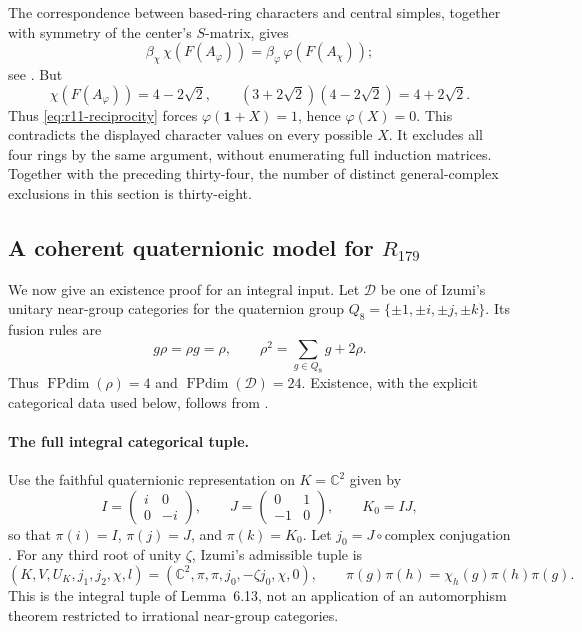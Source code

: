 The correspondence between based-ring characters and central simples,
together with symmetry of the center's $S$-matrix, gives
\begin{equation}\label{eq:r11-reciprocity}
 \beta_\chi\,\chi(F(A_\varphi))
 =\beta_\varphi\,\varphi(F(A_\chi));
\end{equation}
see \cite[Example~2.9 and the discussion preceding Theorem~2.13]
{OstrikPivotal}. But
\[
 \chi(F(A_\varphi))=4-2\sqrt2,
 \qquad
 (3+2\sqrt2)(4-2\sqrt2)=4+2\sqrt2.
\]
Thus \eqref{eq:r11-reciprocity} forces
$\varphi(\mathbf1+X)=1$, hence $\varphi(X)=0$. This contradicts the
displayed character values on every possible $X$. It excludes all four
rings by the same argument, without enumerating full induction matrices.
Together with the preceding thirty-four, the number of distinct
general-complex exclusions in this section is thirty-eight.

\subsection{A coherent quaternionic model for $R_{179}$}
\label{subsec:r11-quaternionic-model}

We now give an existence proof for an integral input. Let $\mathcal D$ be
one of Izumi's unitary near-group categories for the quaternion group
$Q_8=\{\pm1,\pm i,\pm j,\pm k\}$. Its fusion rules are
\begin{equation}\label{eq:r11-Q8-base}
 g\rho=\rho g=\rho,
 \qquad \rho^2=\sum_{g\in Q_8}g+2\rho.
\end{equation}
Thus $\operatorname{FPdim}(\rho)=4$ and
$\operatorname{FPdim}(\mathcal D)=24$.
Existence, with the explicit categorical data used below, follows from
\cite[Theorems~1.1 and~6.1, Lemma~6.13]{Izumi}.

\paragraph{The full integral categorical tuple.}
Use the faithful quaternionic representation on $K=\mathbb C^2$ given by
\[
 I=\begin{pmatrix}i&0\\0&-i\end{pmatrix},
 \qquad J=\begin{pmatrix}0&1\\-1&0\end{pmatrix},
 \qquad K_0=IJ,
\]
so that $\pi(i)=I$, $\pi(j)=J$, and $\pi(k)=K_0$.
Let $j_0=J\circ\text{complex conjugation}$. For any third root of unity
$\zeta$, Izumi's admissible tuple is
\begin{equation}\label{eq:r11-integral-tuple}
 (K,V,U_K,j_1,j_2,\chi,l)
 =(\mathbb C^2,\pi,\pi,j_0,-\zeta j_0,\chi,0),
 \qquad
 \pi(g)\pi(h)=\chi_h(g)\pi(h)\pi(g).
\end{equation}
This is the integral tuple of Lemma~6.13, not an application of an
automorphism theorem restricted to irrational near-group categories.

